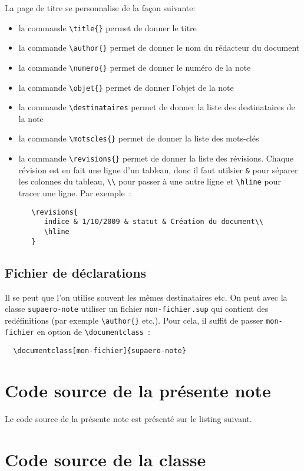 \documentclass[french]{supaero-note}
\begin{document}
La page de titre se personnalise de la façon suivante:

\begin{itemize}
\item la commande \verb!\title{}! permet de donner le titre
\item la commande \verb!\author{}! permet de donner le nom du
  rédacteur du document
\item la commande \verb!\numero{}! permet de donner le numéro de la
  note
\item la commande \verb!\objet{}! permet de donner l'objet de la note
\item la commande \verb!\destinataires! permet de donner la liste des
  destinataires de la note
\item la commande \verb!\motscles{}! permet de donner la liste des
  mots-clés
\item la commande \verb!\revisions{}! permet de donner la liste des
  révisions. Chaque révision est en fait une ligne d'un tableau, donc
  il faut utilsier \verb!&! pour séparer les colonnes du tableau,
  \verb!\\! pour passer à une autre ligne et \verb!\hline! pour tracer
  une ligne. Par exemple~:

\begin{verbatim}
   \revisions{
      indice & 1/10/2009 & statut & Création du document\\
      \hline
   } 
\end{verbatim}
\end{itemize}

\subsection{Fichier de déclarations}
\label{sec:fich-de-decl}

Il se peut que l'on utilise souvent les mêmes destinataires etc. On
peut avec la classe \texttt{supaero-note} utiliser un fichier
\texttt{mon-fichier.sup} qui contient des redéfinitions (par exemple
\verb!\author{}! etc.). Pour cela, il suffit de passer
\verb!mon-fichier! en option de \verb!\documentclass!~:

\begin{verbatim}
  \documentclass[mon-fichier]{supaero-note}
\end{verbatim}

\section{Code source de la présente note}
\label{sec:code-source}

Le code source de la présente note est présenté sur le listing
suivant.



\section{Code source de la classe}
\label{sec:code-source-supaero-note}





\end{document}
